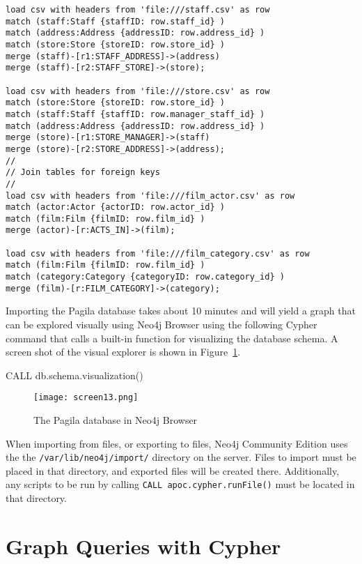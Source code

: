 \begin{verbatim}
load csv with headers from 'file:///staff.csv' as row
match (staff:Staff {staffID: row.staff_id} )
match (address:Address {addressID: row.address_id} )
match (store:Store {storeID: row.store_id} )
merge (staff)-[r1:STAFF_ADDRESS]->(address)
merge (staff)-[r2:STAFF_STORE]->(store);

load csv with headers from 'file:///store.csv' as row
match (store:Store {storeID: row.store_id} )
match (staff:Staff {staffID: row.manager_staff_id} )
match (address:Address {addressID: row.address_id} )
merge (store)-[r1:STORE_MANAGER]->(staff)
merge (store)-[r2:STORE_ADDRESS]->(address);
//
// Join tables for foreign keys
//
load csv with headers from 'file:///film_actor.csv' as row
match (actor:Actor {actorID: row.actor_id} )
match (film:Film {filmID: row.film_id} )
merge (actor)-[r:ACTS_IN]->(film);

load csv with headers from 'file:///film_category.csv' as row
match (film:Film {filmID: row.film_id} )
match (category:Category {categoryID: row.category_id} )
merge (film)-[r:FILM_CATEGORY]->(category);
\end{verbatim}
\normalsize

Importing the Pagila database takes about 10 minutes and will yield a graph that can be explored visually using Neo4j Browser using the following Cypher command that calls a built-in function for visualizing the database schema. A screen shot of the visual explorer is shown in Figure~\ref{fig:pagilagraph}.

\begin{cyphercode}
CALL db.schema.visualization()
\end{cyphercode}


\begin{figure}
\texttt{[image: screen13.png]}
\caption{The Pagila database in Neo4j Browser}
\label{fig:pagilagraph}
\end{figure}

\begin{tcolorbox}[colback=alert]
When importing from files, or exporting to files, Neo4j Community Edition uses the the \texttt{/var/lib/neo4j/import/} directory on the server. Files to import must be placed in that directory, and exported files will be created there. Additionally, any scripts to be run by calling \texttt{CALL apoc.cypher.runFile()} must be located in that directory.
\end{tcolorbox}

\section{Graph Queries with Cypher}

